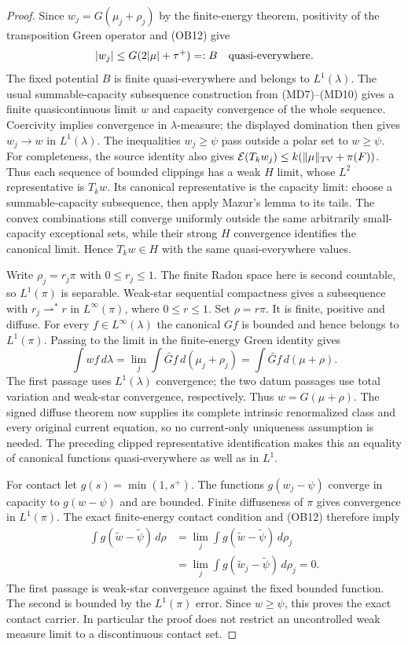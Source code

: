 \begin{proof}
Since $w_j=G(\mu_j+\rho_j)$ by the finite-energy theorem, positivity
of the transposition Green operator and (OB12) give
\[
                  |w_j|\le G(2|\mu|+\tau^+)=:B
                                        \quad\hbox{quasi-everywhere}.
\]
The fixed potential $B$ is finite quasi-everywhere and belongs to
$L^1(\lambda)$.  The usual summable-capacity subsequence construction
from (MD7)--(MD10) gives a finite quasicontinuous limit $w$ and
capacity convergence of the whole sequence.  Coercivity implies
convergence in $\lambda$-measure; the displayed domination then
gives $w_j\to w$ in $L^1(\lambda)$.  The inequalities $w_j\ge\psi$
pass outside a polar set to $w\ge\psi$.
For completeness, the source identity also gives
$\mathcal E(T_kw_j)\le k(\|\mu\|_{\rm TV}+\pi(F))$.
Thus each sequence of bounded clippings has a weak $H$ limit, whose
$L^2$ representative is $T_kw$.  Its canonical representative is the
capacity limit: choose a summable-capacity subsequence, then apply
Mazur's lemma to its tails.  The convex combinations still converge
uniformly outside the same arbitrarily small-capacity exceptional
sets, while their strong $H$ convergence identifies the canonical
limit.  Hence $T_kw\in H$ with the same quasi-everywhere values.

Write $\rho_j=r_j\pi$ with $0\le r_j\le1$.  The finite Radon
space here is second countable, so $L^1(\pi)$ is separable.
Weak-star sequential compactness gives a subsequence with
$r_j\rightharpoonup^*r$ in $L^\infty(\pi)$, where $0\le r\le1$.
Set $\rho=r\pi$.  It is finite, positive and diffuse.  For every
$f\in L^\infty(\lambda)$ the canonical $Gf$ is bounded and hence
belongs to $L^1(\pi)$.  Passing to the limit in the finite-energy
Green identity gives
\[
 \int wf\,d\lambda
       =\lim_j\int\widetilde{Gf}\,d(\mu_j+\rho_j)
       =\int\widetilde{Gf}\,d(\mu+\rho).
 \tag{OB14}
\]
The first passage uses $L^1(\lambda)$ convergence; the two datum
passages use total variation and weak-star convergence, respectively.
Thus $w=G(\mu+\rho)$.  The signed diffuse theorem now supplies its
complete intrinsic renormalized class and every original current
equation, so no current-only uniqueness assumption is needed.
The preceding clipped representative identification makes this an
equality of canonical functions quasi-everywhere as well as in $L^1$.

For contact let $g(s)=\min(1,s^+)$.  The functions
$g(w_j-\psi)$ converge in capacity to $g(w-\psi)$ and are bounded.
Finite diffuseness of $\pi$ gives convergence in $L^1(\pi)$.
The exact finite-energy contact condition and (OB12) therefore imply
\[
 \begin{split}
 \int g(\widetilde w-\widetilde\psi)\,d\rho
 &=\lim_j\int g(\widetilde w-\widetilde\psi)\,d\rho_j\\
 &=\lim_j\int g(\widetilde w_j-\widetilde\psi)\,d\rho_j=0.
 \end{split}
 \tag{OB15}
\]
The first passage is weak-star convergence against the fixed bounded
function.  The second is bounded by the $L^1(\pi)$ error.  Since
$w\ge\psi$, this proves the exact contact carrier.  In particular
the proof does not restrict an uncontrolled weak measure limit to a
discontinuous contact set.


\end{proof}
